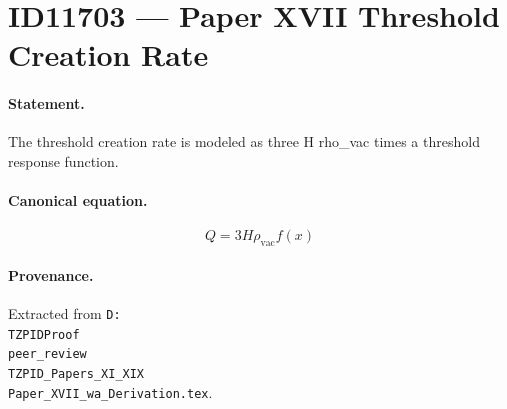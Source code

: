 \section*{ID11703 --- Paper XVII Threshold Creation Rate}

\paragraph{Statement.}
The threshold creation rate is modeled as three H rho_vac times a threshold response function.

\paragraph{Canonical equation.}
\[
Q=3H\rho_{\mathrm{vac}}f(x)
\]

\paragraph{Provenance.}
Extracted from \texttt{D:\\TZPIDProof\\peer\_review\\TZPID\_Papers\_XI\_XIX\\Paper\_XVII\_wa\_Derivation.tex}.
